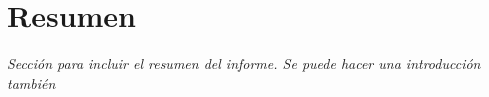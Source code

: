 \section*{Resumen}

\textit{Sección para incluir el resumen del informe. Se puede hacer
una introducción también \cite{zemansky}}
